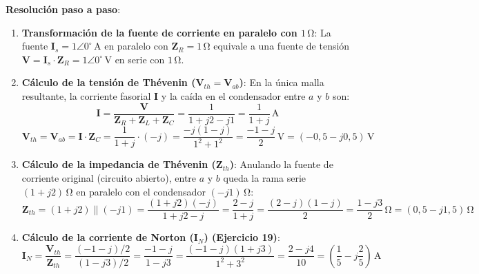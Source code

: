 \begin{ejercicio}
\textbf{Resolución paso a paso}:
\begin{enumerate}
    \item \textbf{Transformación de la fuente de corriente en paralelo con $1\,\si{\ohm}$}:
    La fuente $\mathbf{I}_s = 1\angle 0^\circ\,\si{\ampere}$ en paralelo con $\mathbf{Z}_R = 1\,\si{\ohm}$ equivale a una fuente de tensión $\mathbf{V} = \mathbf{I}_s \cdot \mathbf{Z}_R = 1\angle 0^\circ\,\si{\volt}$ en serie con $1\,\si{\ohm}$.
    \item \textbf{Cálculo de la tensión de Thévenin ($\mathbf{V}_{th} = \mathbf{V}_{ab}$)}:
    En la única malla resultante, la corriente fasorial $\mathbf{I}$ y la caída en el condensador entre $a$ y $b$ son:
    \begin{equation*}
        \mathbf{I} = \frac{\mathbf{V}}{\mathbf{Z}_R + \mathbf{Z}_L + \mathbf{Z}_C} = \frac{1}{1 + j 2 - j 1} = \frac{1}{1 + j}\,\si{\ampere}
    \end{equation*}
    \begin{equation*}
        \boxed{\mathbf{V}_{th} = \mathbf{V}_{ab} = \mathbf{I}\cdot\mathbf{Z}_C = \frac{1}{1 + j}\cdot(-j) = \frac{-j(1 - j)}{1^2 + 1^2} = \frac{-1 - j}{2}\,\si{\volt} = (-0{,}5 - j 0{,}5)\,\si{\volt}}
    \end{equation*}
    \item \textbf{Cálculo de la impedancia de Thévenin ($\mathbf{Z}_{th}$)}:
    Anulando la fuente de corriente original (circuito abierto), entre $a$ y $b$ queda la rama serie $(1 + j 2)\,\si{\ohm}$ en paralelo con el condensador $(-j 1)\,\si{\ohm}$:
    \begin{equation*}
        \boxed{\mathbf{Z}_{th} = (1 + j 2) \parallel (-j 1) = \frac{(1 + j 2)(-j)}{1 + j 2 - j} = \frac{2 - j}{1 + j} = \frac{(2 - j)(1 - j)}{2} = \frac{1 - j 3}{2}\,\si{\ohm} = (0{,}5 - j 1{,}5)\,\si{\ohm}}
    \end{equation*}
    \item \textbf{Cálculo de la corriente de Norton ($\mathbf{I}_N$) (Ejercicio 19)}:
    \begin{equation*}
        \boxed{\mathbf{I}_N = \frac{\mathbf{V}_{th}}{\mathbf{Z}_{th}} = \frac{(-1 - j)/2}{(1 - j 3)/2} = \frac{-1 - j}{1 - j 3} = \frac{(-1 - j)(1 + j 3)}{1^2 + 3^2} = \frac{2 - j 4}{10} = \left(\frac{1}{5} - j\frac{2}{5}\right)\,\si{\ampere}}
    \end{equation*}
\end{enumerate}
\end{ejercicio}

